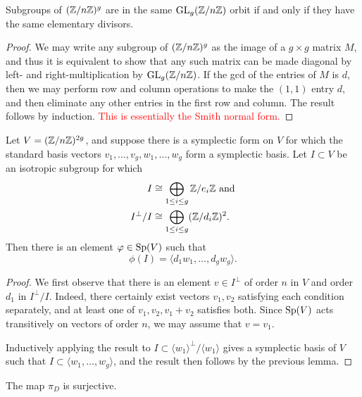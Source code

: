 \documentclass{amsart}
\begin{document}
\begin{lemma}
Subgroups of $(\mathbb{Z}/n\mathbb{Z})^g$ are in the same $\operatorname{GL}_g(\mathbb{Z}/n\mathbb{Z})$ orbit if and only if they have the same elementary divisors.
\end{lemma}

\begin{proof}
  We may write any subgroup of $(\mathbb{Z}/n\mathbb{Z})^g$ as the image of a $g\times g$ matrix $M$, and thus it is equivalent to show that any such matrix can be made diagonal by left- and right-multiplication by $\operatorname{GL}_g(\mathbb{Z}/n\mathbb{Z})$.  If the gcd of the entries of $M$ is $d$, then we may perform row and column operations to make the $(1,1)$ entry $d$, and then eliminate any other entries in the first row and column. The result follows by induction. \textcolor{red}{This is essentially the Smith normal form.}
\end{proof}

\begin{proposition}\label{prop:diagonalize-symplectic}
  Let $V=(\mathbb{Z}/n\mathbb{Z})^{2g}$, and suppose there is a symplectic form on $V$ for which the standard basis vectors $v_1, \ldots, v_g, w_1, \ldots, w_g$ form a symplectic basis. Let $I \subset V$ be an isotropic subgroup for which
  \begin{align*}
    I&\cong \bigoplus_{1\le i\le g} \mathbb{Z}/e_i\mathbb{Z} \textrm{ and} \\
    I^\perp/I&\cong \bigoplus_{1\le i\le g} (\mathbb{Z}/d_i\mathbb{Z})^2.
  \end{align*}
Then there is an element $\varphi\in \operatorname{Sp}(V)$ such that
\[
  \phi(I) = \langle d_1w_1,\dots,d_gw_g \rangle.
\]  
\end{proposition}

\begin{proof}
  We first observe that there is an element $v\in I^\perp$ of order $n$ in $V$ and order $d_1$ in $I^\perp/I$.  Indeed, there certainly exist vectors $v_1,v_2$ satisfying each condition separately, and at least one of $v_1,v_2,v_1+v_2$ satisfies both.  Since $\operatorname{Sp}(V)$ acts transitively on vectors of order $n$, we may assume that $v=v_1$.

  Inductively applying the result to $I\subset \langle w_1 \rangle^\perp/\langle w_1 \rangle$ gives a symplectic basis of $V$ such that $I\subset \langle w_1,\ldots,w_g \rangle$, and the result then follows by the previous lemma.
\end{proof}

\begin{lemma}\label{lem:piDsurjlem}
The map $\pi_D$ is surjective.
\end{lemma}
\end{document}
